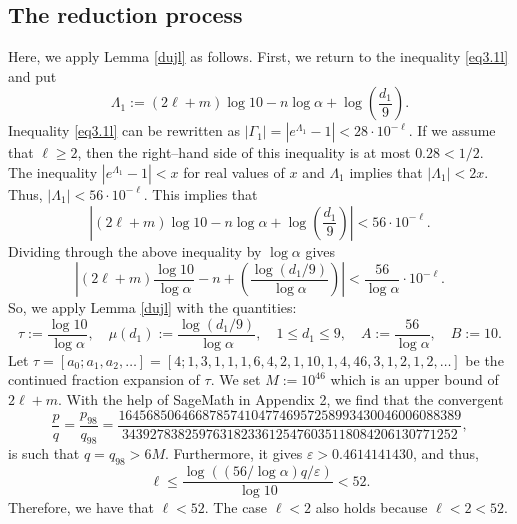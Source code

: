 \subsection{The reduction process}\label{subsecl}
Here, we apply Lemma \ref{dujl} as follows. First, we return to the inequality \eqref{eq3.1l} and put
\[
\Lambda_1 := (2\ell + m) \log 10 - n \log \alpha + \log \left( \frac{d_1}{9} \right).
\]
Inequality \eqref{eq3.1l} can be rewritten as
$|\Gamma_1| = |e^{\Lambda_1} - 1| < 28\cdot10^{-\ell}$. If we assume that \(\ell \geq 2\), then the right--hand side of this inequality is at most \(0.28 < 1/2\). The inequality \(|e^{\Lambda_1} - 1| < x\) for real values of \(x\) and \({\Lambda_1}\) implies that \(|{\Lambda_1}| < 2x\). Thus,
$|\Lambda_1| < 56\cdot10^{-\ell}$. This implies that
\[
\left| (2\ell + m) \log 10 - n \log \alpha + \log \left( \frac{d_1}{9}\right) \right| < 56\cdot10^{-\ell}.
\]
Dividing through the above inequality by \(\log \alpha\) gives
\[
\left| (2\ell + m) \frac{\log 10}{\log \alpha} - n + \left( \frac{\log(d_1/9)}{\log \alpha} \right) \right| < \frac{56}{\log \alpha}\cdot 10^{-\ell}.
\]
So, we apply Lemma \ref{dujl} with the quantities:
\[
\tau := \frac{\log 10}{\log \alpha}, \quad \mu(d_1) := \frac{\log(d_1/9)}{\log \alpha}, \quad 1 \leq d_1 \leq 9, \quad A := \frac{56}{\log \alpha}, \quad B := 10.
\]
Let \(\tau = [a_0; a_1, a_2, \ldots] = [4; 1, 3, 1, 1, 1, 6, 4, 2, 1, 10, 1, 4, 46, 3, 1, 2, 1, 2, \ldots]\) be the continued fraction expansion of \(\tau\). We set \(M := 10^{46}\) which is an upper bound of \(2\ell + m\). With the help of SageMath in Appendix 2, we find that the convergent
\[
\dfrac{p}{q} = \dfrac{p_{98}}{q_{98}}   = \dfrac{1645685064668785741047746957258993430046006088389}{343927838259763182336125476035118084206130771252} ,
\]
is such that \(q = q_{98} > 6M\). Furthermore, it gives \(\varepsilon > 0.4614141430\), and thus,
\[
\ell \leq \frac{\log((56/\log \alpha)q/\varepsilon)}{\log 10} < 52.
\]
Therefore, we have that \(\ell < 52\). The case \(\ell < 2\) also holds because \(\ell < 2 < 52\).

